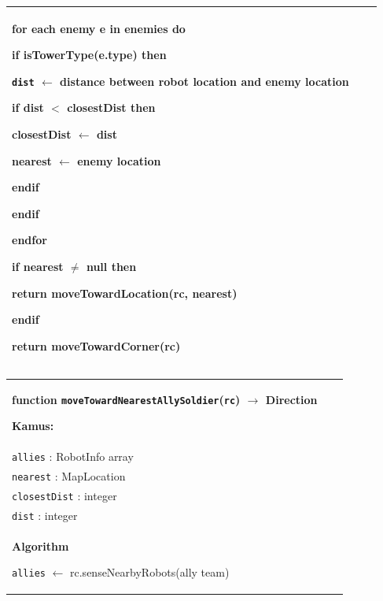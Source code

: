 \documentclass{article}
\newenvironment{pseudobox}
{
\centering
\begin{longtable}{|p{0.94\linewidth}|}
\hline
}
{
\\ \hline
\end{longtable}
\vspace{0.05cm}
}
\begin{document}
\begin{enumerate}[label=\alph*.]
\begin{pseudobox}
\hspace*{1.5em}for each enemy e in enemies do

\hspace*{3em}if isTowerType(e.type) then

\hspace*{4.5em}\texttt{dist} $\leftarrow$ distance between robot location and enemy location

\hspace*{4.5em}if dist $<$ closestDist then

\hspace*{6em}closestDist $\leftarrow$ dist

\hspace*{6em}nearest $\leftarrow$ enemy location

\hspace*{4.5em}endif

\hspace*{3em}endif

\hspace*{1.5em}endfor

\hspace*{1.5em}if nearest $\neq$ null then

\hspace*{3em}return moveTowardLocation(rc, nearest)

\hspace*{1.5em}endif

\hspace*{1.5em}return moveTowardCorner(rc)
\end{pseudobox}

\begin{pseudobox}
\textbf{function \texttt{moveTowardNearestAllySoldier}(\texttt{rc}) $\rightarrow$ Direction}

\textbf{Kamus:} \\
\hspace*{1.5em}\texttt{allies} : RobotInfo array \\
\hspace*{1.5em}\texttt{nearest} : MapLocation \\
\hspace*{1.5em}\texttt{closestDist} : integer \\
\hspace*{1.5em}\texttt{dist} : integer \\

\textbf{Algorithm}

\hspace*{1.5em}\texttt{allies} $\leftarrow$ rc.senseNearbyRobots(ally team)


\end{pseudobox}
\end{enumerate}
\end{document}
